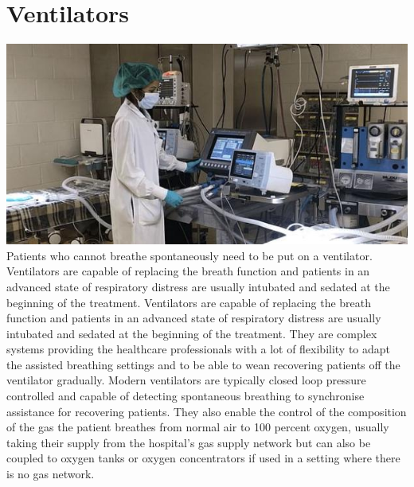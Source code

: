 \documentclass[12pt]{article}
\begin{document}
\section{Ventilators}
\includegraphics[scale=0.4]{vnt.jpg} 
\\
Patients who cannot breathe spontaneously need to be put on a ventilator.
Ventilators are capable of replacing the breath function and patients in an
advanced state of respiratory distress are usually intubated and sedated at
the beginning of the treatment.
Ventilators are capable of replacing the breath function and patients in
an advanced state of respiratory distress are usually intubated and sedated
at the beginning of the treatment. They are complex systems providing
the healthcare professionals with a lot of flexibility to adapt the assisted
breathing settings and to be able to wean recovering patients off the ventilator
gradually.
Modern ventilators are typically closed loop pressure controlled and capable of detecting spontaneous breathing to synchronise assistance for recovering patients. They also enable the control of the composition of the gas
the patient breathes from normal air to 100 percent oxygen, usually taking
their supply from the hospital’s gas supply network but can also be coupled
to oxygen tanks or oxygen concentrators if used in a setting where there is
no gas network.
\end{document}
